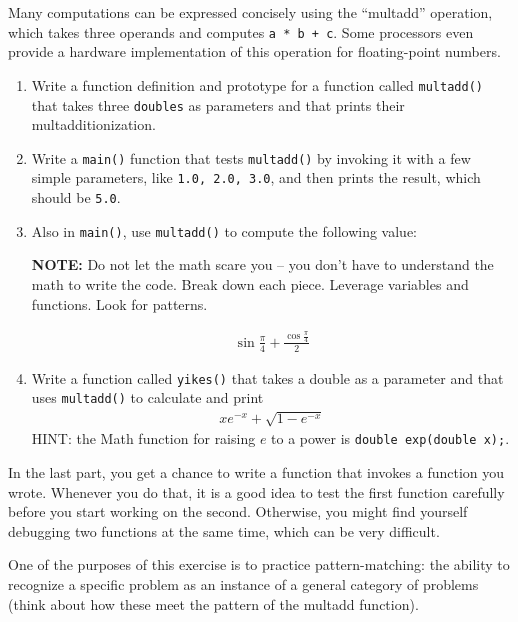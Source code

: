 \begin{exercise}
\label{ex.multadd}

Many computations can be expressed concisely using the ``multadd''
operation, which takes three operands and computes {\tt a * b + c}.  Some
processors even provide a hardware implementation of this operation for
floating-point numbers.

\begin{enumerate}

\item Write a function definition and prototype for a function called {\tt multadd()} that takes three {\tt doubles}
as parameters and that prints their multadditionization.

\item Write a {\tt main()} function that tests {\tt multadd()} by invoking it with a
few simple parameters, like {\tt 1.0, 2.0, 3.0}, and then prints
the result, which should be {\tt 5.0}.

\item Also in {\tt main()}, use {\tt multadd()} to compute the
following value:


{\bf NOTE:} Do not let the math scare you -- you don't have to understand the math to write the code.
Break down each piece. Leverage variables and functions. Look for patterns.

%
\begin{eqnarray*}
& \sin \frac{\pi}{4} + \frac{\cos \frac{\pi}{4}}{2} & 
\end{eqnarray*}
%
\item Write a function called {\tt yikes()} that takes a
double as a parameter and that uses {\tt multadd()} to calculate
and print
%
\begin{eqnarray*}
x e^{-x} + \sqrt{1 - e^{-x}}
\end{eqnarray*}
%
HINT: the Math function for raising $e$ to a power is {\tt double exp(double x);}.

\end{enumerate}

In the last part, you get a chance to write a function that invokes
a function you wrote.  Whenever you do that, it is a good idea to
test the first function carefully before you start working on the
second.  Otherwise, you might find yourself debugging two functions
at the same time, which can be very difficult.

One of the purposes of this exercise is to practice pattern-matching:
the ability to recognize a specific problem as an instance of a
general category of problems (think about how these meet the pattern of the multadd function).


\end{exercise}
